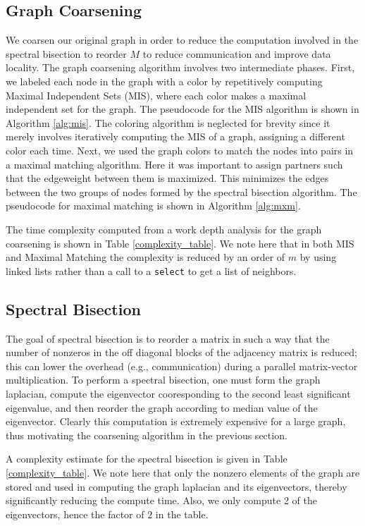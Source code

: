 \documentclass[11pt]{article}
\begin{document}
\subsection{Graph Coarsening}

We coarsen our original graph in order to reduce the computation involved in
the spectral bisection to reorder $M$ to reduce communication and improve data
locality.
The graph coarsening algorithm involves two intermediate phases. First, we
labeled each node in the graph with a color by repetitively computing Maximal
Independent Sets (MIS), where each color makes a maximal independent set for the
graph. The pseudocode for the MIS algorithm is shown in
Algorithm \ref{alg:mis}. The coloring algorithm is neglected for brevity since
it merely involves iteratively computing the MIS of a graph, assigning a
different color each time. Next, we used the
graph colors to match the nodes into pairs in a maximal matching algorithm. Here
it was important to assign partners such that the edgeweight between them is
maximized. This minimizes the edges between the two groups of nodes formed
by the spectral bisection algorithm. The pseudocode for maximal matching is
shown in Algorithm \ref{alg:mxm}. 

The time complexity computed from a work depth analysis for the graph coarsening is shown in Table
\ref{complexity_table}. We note here that in both MIS and Maximal Matching the
complexity is reduced by an order of $m$ by using linked lists rather than
a call to a \texttt{select} to get a list of neighbors. 

\subsection{Spectral Bisection}

The goal of spectral bisection is to reorder a matrix in such a way that the
number of nonzeros in the off diagonal blocks of the adjacency matrix is
reduced; this can lower the overhead (e.g., communication) during a parallel
matrix-vector multiplication. To perform a spectral bisection, one must form the
graph laplacian, compute the eigenvector cooresponding to the second least significant
eigenvalue, and then reorder the graph according to median value of the
eigenvector. Clearly this computation is extremely expensive for a large
graph, thus motivating the coarsening algorithm in the previous section. 

A complexity estimate for the spectral bisection is given in Table
\ref{complexity_table}. We note here that only the nonzero elements of the graph
are stored and used in computing the graph laplacian and its eigenvectors, thereby significantly
reducing the compute time. Also, we only compute 2 of the eigenvectors, hence
the factor of $2$ in the table. 
\end{document}
